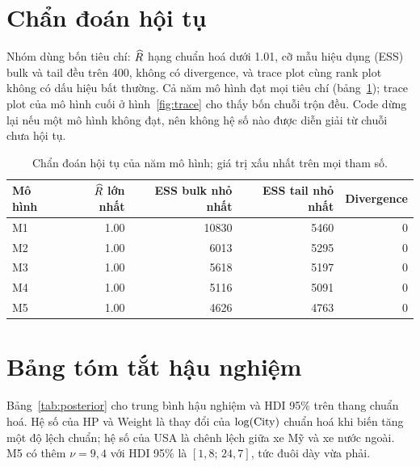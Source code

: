 \documentclass[12pt,a4paper]{report}
\begin{document}

\section{Chẩn đoán hội tụ}

Nhóm dùng bốn tiêu chí: $\widehat{R}$ hạng chuẩn hoá \cite{vehtari2021rhat} dưới
\num{1.01}, cỡ mẫu hiệu dụng (ESS) bulk và tail đều trên 400, không có
divergence, và trace plot cùng rank plot không có dấu hiệu bất thường. Cả năm mô
hình đạt mọi tiêu chí (bảng~\ref{tab:diagnostics}); trace plot của mô hình cuối
ở hình~\ref{fig:trace} cho thấy bốn chuỗi trộn đều. Code dừng lại nếu một mô
hình không đạt, nên không hệ số nào được diễn giải từ chuỗi chưa hội tụ.

\begin{table}[tp]
  \centering
  \caption{Chẩn đoán hội tụ của năm mô hình; giá trị xấu nhất trên mọi tham
    số.}
  \label{tab:diagnostics}
  \begin{tabular}{lrrrr}
    \toprule
    Mô hình & $\widehat{R}$ lớn nhất & ESS bulk nhỏ nhất & ESS tail nhỏ nhất & Divergence \\
    \midrule
    M1 & \num{1.00} & \num{10830} & \num{5460} & 0 \\
    M2 & \num{1.00} & \num{6013}  & \num{5295} & 0 \\
    M3 & \num{1.00} & \num{5618}  & \num{5197} & 0 \\
    M4 & \num{1.00} & \num{5116}  & \num{5091} & 0 \\
    M5 & \num{1.00} & \num{4626}  & \num{4763} & 0 \\
    \bottomrule
  \end{tabular}
\end{table}


\section{Bảng tóm tắt hậu nghiệm}
\label{sec:posterior}

Bảng~\ref{tab:posterior} cho trung bình hậu nghiệm và HDI 95\% trên thang chuẩn
hoá. Hệ số của HP và Weight là thay đổi của $\log(\mathrm{City})$ chuẩn hoá khi biến
tăng một độ lệch chuẩn; hệ số của USA là chênh lệch giữa xe Mỹ và xe nước ngoài.
M5 có thêm $\nu = 9{,}4$ với HDI 95\% là $[1{,}8;\, 24{,}7]$, tức đuôi dày vừa
phải.
\end{document}
